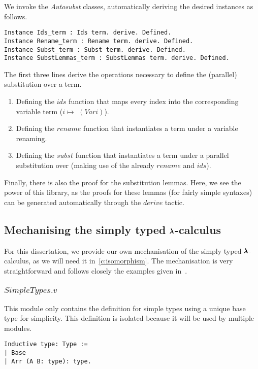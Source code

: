 We invoke the \textit{Autosubst} classes, automatically deriving the desired instances as follows.

\begin{lstlisting}[language=Coq]
Instance Ids_term : Ids term. derive. Defined.
Instance Rename_term : Rename term. derive. Defined.
Instance Subst_term : Subst term. derive. Defined.
Instance SubstLemmas_term : SubstLemmas term. derive. Defined.
\end{lstlisting}

The first three lines derive the operations necessary to define the (parallel) substitution over a term.
\begin{enumerate}
\item Defining the \lst$ids$ function that maps every index into the corresponding variable term ($i \mapsto $ \lst$(Var i)$).
\item Defining the \lst$rename$ function that instantiates a term under a variable renaming.
\item Defining the \lst$subst$ function that instantiates a term under a parallel substitution over (making use of the already \lst$rename$ and $ids$).
\end{enumerate}

Finally, there is also the proof for the substitution lemmas.
Here, we see the power of this library, as the proofs for these lemmas (for fairly simple syntaxes) can be generated automatically through the \lst$derive$ tactic. 


\subsection{Mechanising the simply typed $\pmb{\lambda}$-calculus}

For this dissertation, we provide our own mechanisation of the simply typed $\pmb{\lambda}$-calculus, as we will need it in~\cref{c:isomorphism}.
The mechanisation is very straightforward and follows closely the examples given in~\cite{AutosubstManual,AutosubstSchafer}.

\subsubsection{\lst$SimpleTypes.v$}

This module only contains the definition for simple types using a unique base type for simplicity.
This definition is isolated because it will be used by multiple modules.
\begin{lstlisting}[language=Coq]
Inductive type: Type :=
| Base
| Arr (A B: type): type.
\end{lstlisting}

